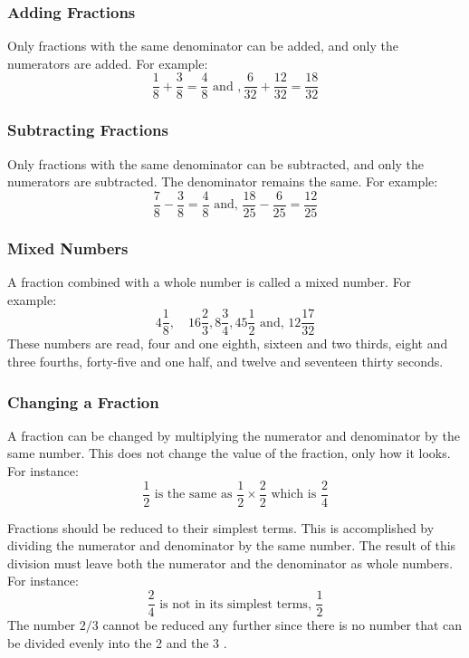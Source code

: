 \subsubsection{Adding Fractions}
Only fractions with the same denominator can be added, and only the numerators are added. For example:
$$
\frac{1}{8}+\frac{3}{8}=\frac{4}{8} \text { and }, \frac{6}{32}+\frac{12}{32}=\frac{18}{32}
$$

\subsubsection{Subtracting Fractions}
Only fractions with the same denominator can be subtracted, and only the numerators are subtracted. The denominator remains the same. For example:
$$
\frac{7}{8}-\frac{3}{8}=\frac{4}{8} \text { and, } \frac{18}{25}-\frac{6}{25}=\frac{12}{25}
$$

\subsubsection{Mixed Numbers}
A fraction combined with a whole number is called a mixed number. For example:
$$
4 \frac{1}{8}, \quad 16 \frac{2}{3}, 8 \frac{3}{4}, 45 \frac{1}{2} \text { and, } 12 \frac{17}{32}
$$
These numbers are read, four and one eighth, sixteen and two thirds, eight and three fourths, forty-five and one half, and twelve and seventeen thirty seconds.

\subsubsection{Changing a Fraction}
A fraction can be changed by multiplying the numerator and denominator by the same number. This does not change the value of the fraction, only how it looks. For instance:
$$
\frac{1}{2} \text { is the same as } \frac{1}{2} \times \frac{2}{2} \text { which is } \frac{2}{4}
$$

Fractions should be reduced to their simplest terms. This is accomplished by dividing the numerator and denominator by the same number. The result of this division must leave both the numerator and the denominator as whole numbers. For instance:
$$
\frac{2}{4} \text { is not in its simplest terms, } \frac{1}{2}
$$
The number $2 / 3$ cannot be reduced any further since there is no number that can be divided evenly into the 2 and the 3 .

